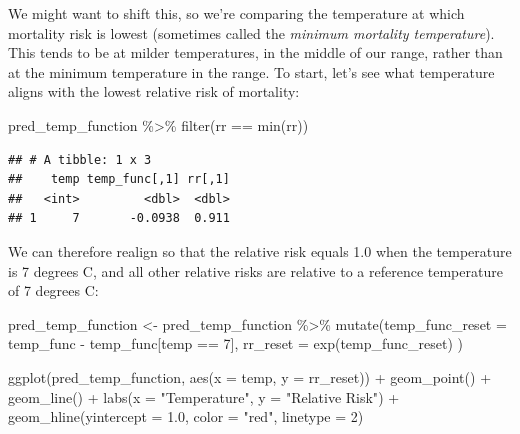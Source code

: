 \documentclass[
]{book}
\newenvironment{Shaded}{\begin{snugshade}}{\end{snugshade}}
\newcommand{\AttributeTok}[1]{\textcolor[rgb]{0.77,0.63,0.00}{#1}}
\newcommand{\DecValTok}[1]{\textcolor[rgb]{0.00,0.00,0.81}{#1}}
\newcommand{\FloatTok}[1]{\textcolor[rgb]{0.00,0.00,0.81}{#1}}
\newcommand{\FunctionTok}[1]{\textcolor[rgb]{0.00,0.00,0.00}{#1}}
\newcommand{\NormalTok}[1]{#1}
\newcommand{\OtherTok}[1]{\textcolor[rgb]{0.56,0.35,0.01}{#1}}
\newcommand{\SpecialCharTok}[1]{\textcolor[rgb]{0.00,0.00,0.00}{#1}}
\newcommand{\StringTok}[1]{\textcolor[rgb]{0.31,0.60,0.02}{#1}}
\begin{document}
We might want to shift this, so we're comparing the temperature at which mortality risk
is lowest (sometimes called the \emph{minimum mortality temperature}). This tends to be at
milder temperatures, in the middle of our range, rather than at the minimum temperature in
the range. To start, let's see what temperature aligns with the lowest relative risk of
mortality:

\begin{Shaded}
\begin{Highlighting}[]
\NormalTok{pred\_temp\_function }\SpecialCharTok{\%\textgreater{}\%} 
  \FunctionTok{filter}\NormalTok{(rr }\SpecialCharTok{==} \FunctionTok{min}\NormalTok{(rr))}
\end{Highlighting}
\end{Shaded}

\begin{verbatim}
## # A tibble: 1 x 3
##    temp temp_func[,1] rr[,1]
##   <int>         <dbl>  <dbl>
## 1     7       -0.0938  0.911
\end{verbatim}

We can therefore realign so that the relative risk equals 1.0 when the temperature is 7 degrees
C, and all other relative risks are relative to a reference temperature of 7 degrees C:

\begin{Shaded}
\begin{Highlighting}[]
\NormalTok{pred\_temp\_function }\OtherTok{\textless{}{-}}\NormalTok{ pred\_temp\_function }\SpecialCharTok{\%\textgreater{}\%} 
  \FunctionTok{mutate}\NormalTok{(}\AttributeTok{temp\_func\_reset =}\NormalTok{ temp\_func }\SpecialCharTok{{-}}\NormalTok{ temp\_func[temp }\SpecialCharTok{==} \DecValTok{7}\NormalTok{],}
         \AttributeTok{rr\_reset =} \FunctionTok{exp}\NormalTok{(temp\_func\_reset)}
\NormalTok{)}

\FunctionTok{ggplot}\NormalTok{(pred\_temp\_function, }\FunctionTok{aes}\NormalTok{(}\AttributeTok{x =}\NormalTok{ temp, }\AttributeTok{y =}\NormalTok{ rr\_reset)) }\SpecialCharTok{+} 
  \FunctionTok{geom\_point}\NormalTok{() }\SpecialCharTok{+} 
  \FunctionTok{geom\_line}\NormalTok{() }\SpecialCharTok{+} 
  \FunctionTok{labs}\NormalTok{(}\AttributeTok{x =} \StringTok{"Temperature"}\NormalTok{, }
       \AttributeTok{y =} \StringTok{"Relative Risk"}\NormalTok{) }\SpecialCharTok{+} 
  \FunctionTok{geom\_hline}\NormalTok{(}\AttributeTok{yintercept =} \FloatTok{1.0}\NormalTok{, }\AttributeTok{color =} \StringTok{"red"}\NormalTok{, }\AttributeTok{linetype =} \DecValTok{2}\NormalTok{)}
\end{Highlighting}
\end{Shaded}
\end{document}
